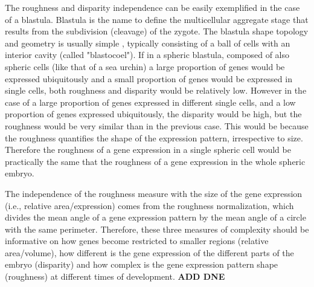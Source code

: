 The roughness and disparity independence can be easily exemplified in the case of a blastula. Blastula is the name to define the multicellular aggregate stage that results from the subdivision (cleavage) of the zygote. The blastula shape topology and geometry is usually simple \citep{Forgacs_Newman2005}, typically consisting of a ball of cells with an interior cavity (called "blastocoel"). If in a spheric blastula, composed of also spheric cells (like that of a sea urchin) a large proportion of genes would be expressed ubiquitously and a small proportion of genes would be expressed in single cells, both roughness and disparity would be relatively low.
However in the case of a large proportion of genes expressed in different single cells, and a low proportion of genes expressed ubiquitously, the disparity would be high, but the roughness would be very similar than in the previous case. This would be because the roughness quantifies the shape of the expression pattern, irrespective to size. Therefore the roughness of a gene expression in a single spheric cell would be practically the same that the roughness of a gene expression in the whole spheric embryo.

The independence of the roughness measure with the size of the gene expression (i.e., relative area/expression) comes from the roughness normalization, which divides the mean angle of a gene expression pattern by the mean angle of a circle with the same perimeter.
Therefore, these three measures of complexity should be informative on how genes become restricted to smaller regions (relative area/volume), how different is the gene expression of the different parts of the embryo (disparity) and how complex is the gene expression pattern shape (roughness) at different times of development.
\textbf{ADD DNE}